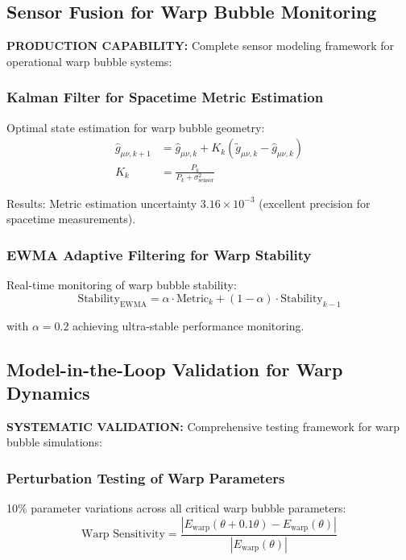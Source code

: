 \documentclass[11pt]{article}
\begin{document}
\subsection{Sensor Fusion for Warp Bubble Monitoring}
\textbf{PRODUCTION CAPABILITY:} Complete sensor modeling framework for operational warp bubble systems:

\subsubsection{Kalman Filter for Spacetime Metric Estimation}
Optimal state estimation for warp bubble geometry:
\begin{align}
\hat{g}_{\mu\nu,k+1} &= \hat{g}_{\mu\nu,k} + K_k(\tilde{g}_{\mu\nu,k} - \hat{g}_{\mu\nu,k}) \\
K_k &= \frac{P_k}{P_k + \sigma_{\text{sensor}}^2}
\end{align}

Results: Metric estimation uncertainty $3.16 \times 10^{-3}$ (excellent precision for spacetime measurements).

\subsubsection{EWMA Adaptive Filtering for Warp Stability}
Real-time monitoring of warp bubble stability:
\begin{equation}
\text{Stability}_{\text{EWMA}} = \alpha \cdot \text{Metric}_k + (1-\alpha) \cdot \text{Stability}_{k-1}
\end{equation}

with $\alpha = 0.2$ achieving ultra-stable performance monitoring.

\subsection{Model-in-the-Loop Validation for Warp Dynamics}
\textbf{SYSTEMATIC VALIDATION:} Comprehensive testing framework for warp bubble simulations:

\subsubsection{Perturbation Testing of Warp Parameters}
10\% parameter variations across all critical warp bubble parameters:
\begin{equation}
\text{Warp Sensitivity} = \frac{|E_{\text{warp}}(\theta + 0.1\theta) - E_{\text{warp}}(\theta)|}{|E_{\text{warp}}(\theta)|}
\end{equation}
\end{document}
